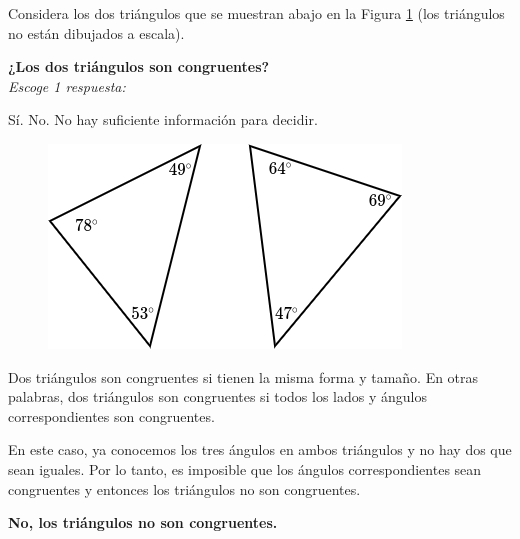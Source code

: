 Considera los dos triángulos que se muestran abajo en la Figura \ref{fig:20230323153911} (los triángulos no están dibujados a escala).

\begin{minipage}{0.6\textwidth}
    \textbf{¿Los dos triángulos son congruentes?}\\
    \emph{Escoge 1 respuesta:}\\
    \begin{choices}
        \choice Sí.
        \CorrectChoice No.
        \choice No hay suficiente información para decidir.
    \end{choices}
\end{minipage}%
\begin{minipage}{0.35\textwidth}
    \begin{figure}[H]
        \centering
        \includegraphics[width=\linewidth]{../images/20230323153911}
        \caption{}
        \label{fig:20230323153911}
    \end{figure}
\end{minipage}

\begin{solutionbox}{2.5cm}\footnotesize
    Dos triángulos son congruentes si tienen la misma forma y tamaño. En otras palabras, dos triángulos son congruentes si todos los lados y ángulos correspondientes son congruentes.

    En este caso, ya conocemos los tres ángulos en ambos triángulos y no hay dos que sean iguales.
    Por lo tanto, es imposible que los ángulos correspondientes sean congruentes y entonces los triángulos no son congruentes.

    \textbf{No, los triángulos no son congruentes.}
\end{solutionbox}